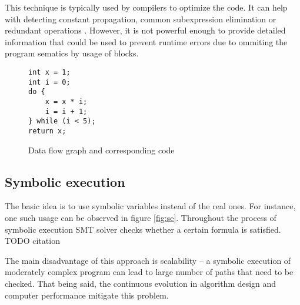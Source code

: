 \documentclass[12pt,final,oneside]{fithesis2}
\theoremstyle{definition}
\begin{document}
This technique is typically used by compilers to optimize the code. It
can help with detecting constant propagation, common subexpression
elimination or redundant operations \cite{Kildall73-1}. However, it is
not powerful enough to provide detailed information that could be used
to prevent runtime errors due to ommiting the program sematics by usage
of blocks.

\begin{figure}[ht]
\begin{minipage}{0.3\textwidth}
\begin{lstlisting}
int x = 1;
int i = 0;
do {
    x = x * i;
    i = i + 1;
} while (i < 5);
return x;
\end{lstlisting}
\end{minipage}
\begin{minipage}{0.7\textwidth}
\centering
{}
\end{minipage}
\caption{Data flow graph and corresponding code}
\label{fig:dfg}
\end{figure}


\subsection{Symbolic execution}

The basic idea is to use symbolic variables instead of the real ones.
For instance, one such usage can be observed in figure \ref{fig:se}.
Throughout the process of symbolic execution SMT solver checks whether
a certain formula is satisfied. TODO citation

The main disadvantage of this approach is scalability -- a symbolic
execution of moderately complex program can lead to large number of paths
that need to be checked. That being said, the continuous evolution in
algorithm design and computer performance mitigate this problem.
\end{document}
